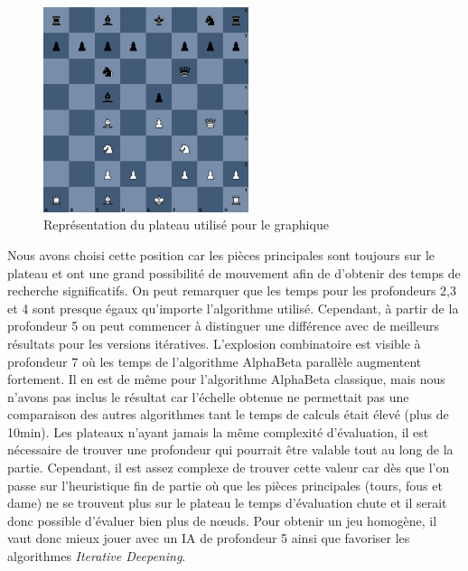 \documentclass{article}
\begin{document}
\begin{figure}[h]
    \centering
    \includegraphics[width=\textwidth,height=6.0cm,keepaspectratio]{board.png}
    \caption{Représentation du plateau utilisé pour le graphique}
    \label{board}
\end{figure}
\FloatBarrier
Nous avons choisi cette position car les pièces principales sont toujours sur le plateau et ont une grand possibilité de mouvement afin de d'obtenir des temps de recherche significatifs.
On peut remarquer que les temps pour les profondeurs 2,3 et 4 sont presque égaux qu'importe l'algorithme utilisé. Cependant, à partir de la profondeur 5 on peut commencer à distinguer
une différence avec de meilleurs résultats pour les versions itératives. L'explosion combinatoire est visible à profondeur 7 où les temps de l'algorithme AlphaBeta parallèle augmentent fortement. Il en est de même pour l'algorithme AlphaBeta classique,
mais nous n'avons pas inclus le résultat car l'échelle obtenue ne permettait pas une comparaison des autres algorithmes tant le temps de calculs était élevé (plus de 10min). Les plateaux n'ayant jamais
la même complexité d'évaluation, il est nécessaire de trouver une profondeur qui pourrait être valable tout au long de la partie. Cependant, il est assez complexe de trouver cette valeur car dès que l'on
passe sur l'heuristique fin de partie où que les pièces principales (tours, fous et dame) ne se trouvent plus sur le plateau le temps d'évaluation chute et il serait donc possible d'évaluer bien plus de nœuds.
Pour obtenir un jeu homogène, il vaut donc mieux jouer avec un IA de profondeur 5 ainsi que favoriser les algorithmes \textit{Iterative Deepening}.
\end{document}
